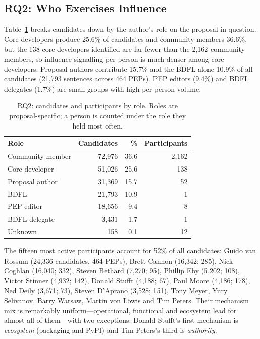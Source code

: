 \documentclass[sigconf,screen]{acmart}
\begin{document}
\subsection{RQ2: Who Exercises Influence}

Table~\ref{tab:rq2} breaks candidates down by the author's role on the proposal in question. Core developers produce 25.6\% of candidates and community members 36.6\%, but the 138 core developers identified are far fewer than the 2,162 community members, so influence signalling per person is much denser among core developers. Proposal authors contribute 15.7\% and the BDFL alone 10.9\% of all candidates (21,793 sentences across 464 PEPs). PEP editors (9.4\%) and BDFL delegates (1.7\%) are small groups with high per-person volume.

\begin{table}[t]
\caption{RQ2: candidates and participants by role. Roles are proposal-specific; a person is counted under the role they held most often.}
\label{tab:rq2}
\begin{tabular}{lrrr}
\toprule
Role & Candidates & \% & Participants \\
\midrule
Community member & 72,976 & 36.6 & 2,162 \\
Core developer & 51,026 & 25.6 & 138 \\
Proposal author & 31,369 & 15.7 & 52 \\
BDFL & 21,793 & 10.9 & 1 \\
PEP editor & 18,656 & 9.4 & 8 \\
BDFL delegate & 3,431 & 1.7 & 1 \\
Unknown & 158 & 0.1 & 12 \\
\bottomrule
\end{tabular}
\end{table}

The fifteen most active participants account for 52\% of all candidates: Guido van Rossum (24,336 candidates, 464 PEPs), Brett Cannon (16,342; 285), Nick Coghlan (16,040; 332), Steven Bethard (7,270; 95), Phillip Eby (5,202; 108), Victor Stinner (4,932; 142), Donald Stufft (4,188; 67), Paul Moore (4,186; 178), Ned Deily (3,671; 73), Steven D'Aprano (3,528; 151), Tony Meyer, Yury Selivanov, Barry Warsaw, Martin von L\"owis and Tim Peters. Their mechanism mix is remarkably uniform---operational, functional and ecosystem lead for almost all of them---with two exceptions: Donald Stufft's first mechanism is \emph{ecosystem} (packaging and PyPI) and Tim Peters's third is \emph{authority}.
\end{document}
